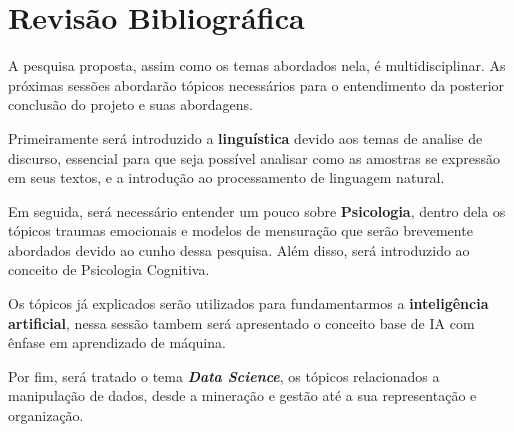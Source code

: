 \chapter{Revisão Bibliográfica}
A pesquisa proposta, assim como os temas abordados nela, é multidisciplinar. As próximas sessões abordarão tópicos necessários para o entendimento da posterior conclusão do projeto e suas abordagens.

Primeiramente será introduzido a \textbf{linguística} devido aos temas de analise de discurso, essencial para que seja possível analisar como as amostras se expressão em seus textos, e a introdução ao processamento de linguagem natural.

Em seguida, será necessário entender um pouco sobre \textbf{Psicologia}, dentro dela os tópicos traumas emocionais e modelos de mensuração que serão brevemente abordados devido ao cunho dessa pesquisa. Além disso, será introduzido ao conceito de Psicologia Cognitiva.

Os tópicos já explicados serão utilizados para fundamentarmos a \textbf{inteligência artificial}, nessa sessão tambem será apresentado o conceito base de IA com ênfase em aprendizado de máquina.

Por fim, será tratado o tema \textit{\textbf{Data Science}}, os tópicos relacionados a manipulação de dados, desde a mineração e gestão até a sua representação e organização.






